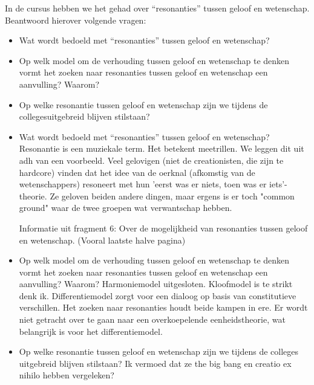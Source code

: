 \documentclass[main.tex]{subfiles}
\begin{document}
\begin{examenvraag}
    \begin{vraag}
        In de cursus hebben we het gehad over “resonanties” tussen geloof en wetenschap. Beantwoord hierover volgende vragen:
        \begin{itemize}
            \item Wat wordt bedoeld met “resonanties” tussen geloof en wetenschap?
            \item Op welk model om de verhouding tussen geloof en wetenschap te denken vormt het zoeken naar resonanties tussen geloof en wetenschap een aanvulling? Waarom?
            \item Op welke resonantie tussen geloof en wetenschap zijn we tijdens de collegesuitgebreid blijven stilstaan?
        \end{itemize}
    \end{vraag}

    \begin{antwoord}
    	\begin{itemize}
    		\item Wat wordt bedoeld met “resonanties” tussen geloof en wetenschap?
    			Resonantie is een muziekale term.
    			Het betekent meetrillen.
    			We leggen dit uit adh van een voorbeeld.
    			Veel gelovigen (niet de creationisten, die zijn te hardcore) vinden dat het idee van de oerknal (afkomstig van de wetenschappers) resoneert met hun 'eerst was er niets,  toen was er iets'-theorie. 
    			Ze geloven beiden andere dingen, maar ergens is er toch "common ground" waar de twee groepen wat verwantschap hebben. 
		
				Informatie uit fragment 6: Over de mogelijkheid van resonanties tussen geloof en wetenschap. (Vooral laatste halve pagina)    	

		 	\item Op welk model om de verhouding tussen geloof en wetenschap te denken vormt het zoeken naar resonanties tussen geloof en wetenschap een aanvulling? Waarom?
		 		Harmoniemodel uitgesloten. Kloofmodel is te strikt denk ik. Differentiemodel zorgt voor een dialoog op basis van constitutieve verschillen. 
		 		Het zoeken naar resonanties houdt beide kampen in ere. 
		 		Er wordt niet getracht over te gaan naar een overkoepelende eenheidstheorie, wat belangrijk is voor het differentiemodel.
		 		
		 	\item Op welke resonantie tussen geloof en wetenschap zijn we tijdens de colleges uitgebreid blijven stilstaan?
		 		Ik vermoed dat ze the big bang en creatio ex nihilo hebben vergeleken? 	
		 	\end{itemize}		
		
    \end{antwoord}
\end{examenvraag}
\end{document}
